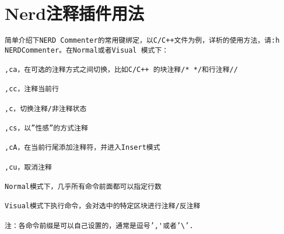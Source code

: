 \section{Nerd注释插件用法}
\begin{verbatim}
简单介绍下NERD Commenter的常用键绑定，以C/C++文件为例，详析的使用方法，请:h NERDCommenter。在Normal或者Visual 模式下：

,ca，在可选的注释方式之间切换，比如C/C++ 的块注释/* */和行注释//

,cc，注释当前行

,c，切换注释/非注释状态

,cs，以”性感”的方式注释

,cA，在当前行尾添加注释符，并进入Insert模式

,cu，取消注释

Normal模式下，几乎所有命令前面都可以指定行数

Visual模式下执行命令，会对选中的特定区块进行注释/反注释

注：各命令前缀是可以自己设置的，通常是逗号’,'或者’\’.
\end{verbatim}
